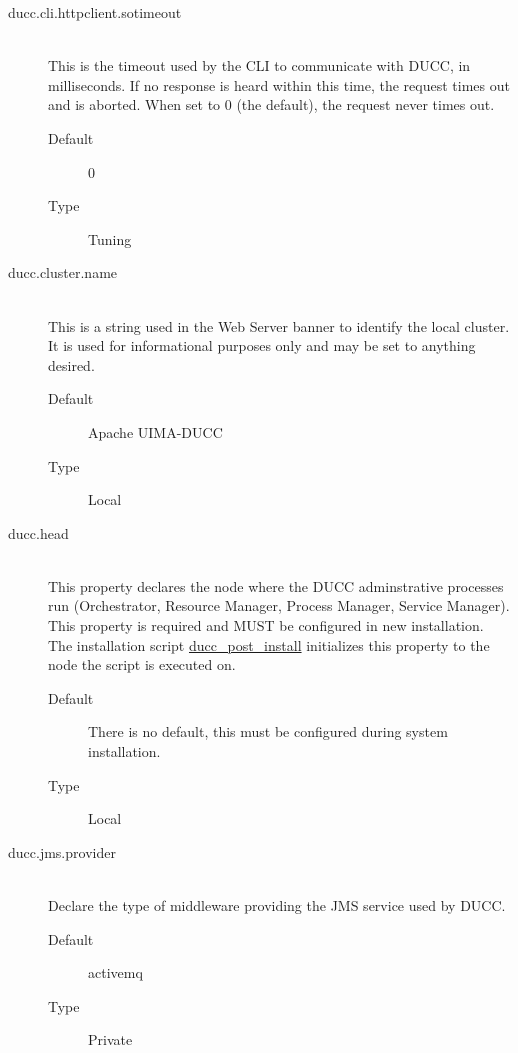 \begin{description}
       \item[ducc.cli.httpclient.sotimeout] \hfill \\
         This is the timeout used by the CLI to communicate with DUCC, in milliseconds. If no 
         response is heard within this time, the request times out and is aborted. When set to 0 (the 
         default), the request never times out. 
         \begin{description}
           \item[Default] 0 
           \item[Type] Tuning 
          \end{description}

       \item[ducc.cluster.name] \hfill \\
         This is a string used in the Web Server banner to identify the local cluster. It is used
         for informational purposes only and may be set to anything desired.
         \begin{description}
           \item[Default] Apache UIMA-DUCC
           \item[Type] Local 
         \end{description}
          
       \item[ducc.head] \hfill \\
         This property declares the node where the DUCC adminstrative processes run (Orchestrator,
         Resource Manager, Process Manager, Service Manager).  This property is required and MUST be
         configured in new installation.  The installation script
         \hyperref[subsec:admin.ducc-post-install]{ducc\_post\_install} initializes this property to the
         node the script is executed on.
         \begin{description}
           \item[Default] There is no default, this must be configured during system installation.
           \item[Type] Local 
         \end{description}

       \item[ducc.jms.provider] \hfill \\
         Declare the type of middleware providing the JMS service used by DUCC.
         \begin{description}
           \item[Default] activemq 
           \item[Type]Private 
         \end{description}


\end{description}
